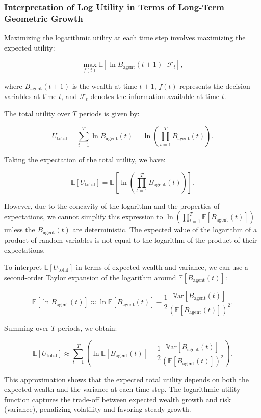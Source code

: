 \subsubsection{Interpretation of Log Utility in Terms of Long-Term Geometric Growth}

Maximizing the logarithmic utility at each time step involves maximizing the expected utility:

\[
\max_{f(t)} \mathbb{E}\left[ \ln B_{\text{agent}}(t+1) \, \big| \, \mathcal{F}_t \right],
\]

where \( B_{\text{agent}}(t+1) \) is the wealth at time \( t+1 \), \( f(t) \) represents the decision variables at time \( t \), and \( \mathcal{F}_t \) denotes the information available at time \( t \).

The total utility over \( T \) periods is given by:

\[
U_{\text{total}} = \sum_{t=1}^{T} \ln B_{\text{agent}}(t) = \ln\left( \prod_{t=1}^{T} B_{\text{agent}}(t) \right).
\]

Taking the expectation of the total utility, we have:

\[
\mathbb{E}[ U_{\text{total}} ] = \mathbb{E}\left[ \ln\left( \prod_{t=1}^{T} B_{\text{agent}}(t) \right) \right].
\]

However, due to the concavity of the logarithm and the properties of expectations, we cannot simplify this expression to \( \ln \left( \prod_{t=1}^{T} \mathbb{E}[ B_{\text{agent}}(t) ] \right) \) unless the \( B_{\text{agent}}(t) \) are deterministic. The expected value of the logarithm of a product of random variables is not equal to the logarithm of the product of their expectations.

To interpret \( \mathbb{E}[ U_{\text{total}} ] \) in terms of expected wealth and variance, we can use a second-order Taylor expansion of the logarithm around \( \mathbb{E}[ B_{\text{agent}}(t) ] \):

\[
\mathbb{E}[ \ln B_{\text{agent}}(t) ] \approx \ln \mathbb{E}[ B_{\text{agent}}(t) ] - \frac{1}{2} \frac{ \mathbb{V}\mathrm{ar}[ B_{\text{agent}}(t) ] }{ \left( \mathbb{E}[ B_{\text{agent}}(t) ] \right)^2 }.
\]

Summing over \( T \) periods, we obtain:

\[
\mathbb{E}[ U_{\text{total}} ] \approx \sum_{t=1}^{T} \left( \ln \mathbb{E}[ B_{\text{agent}}(t) ] - \frac{1}{2} \frac{ \mathbb{V}\mathrm{ar}[ B_{\text{agent}}(t) ] }{ \left( \mathbb{E}[ B_{\text{agent}}(t) ] \right)^2 } \right).
\]

This approximation shows that the expected total utility depends on both the expected wealth and the variance at each time step. The logarithmic utility function captures the trade-off between expected wealth growth and risk (variance), penalizing volatility and favoring steady growth.

